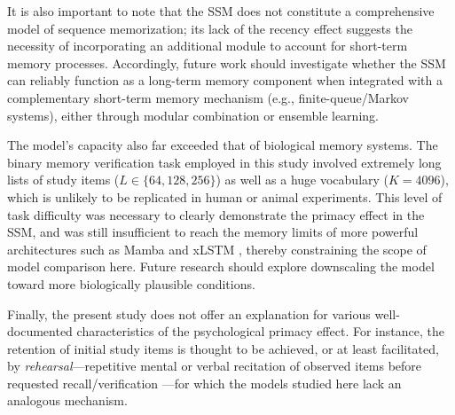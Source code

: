 \documentclass[10pt,letterpaper]{article}
\begin{document}
It is also important to note that the SSM does not constitute a comprehensive model of sequence memorization;
its lack of the recency effect suggests the necessity of incorporating an additional module to account for short-term memory processes.
Accordingly, future work should investigate whether the SSM can reliably function as a long-term memory component when integrated with a complementary short-term memory mechanism (e.g., finite-queue/Markov systems), either through modular combination or ensemble learning.


The model's capacity also far exceeded that of biological memory systems.
The binary memory verification task employed in this study involved extremely long lists of study items ($L \in \{64, 128, 256\}$) as well as a huge vocabulary ($K=4096$), which is unlikely to be replicated in human or animal experiments.
This level of task difficulty was necessary to clearly demonstrate the primacy effect in the SSM, and was still insufficient to reach the memory limits of more powerful architectures such as Mamba \citep{GuDao24,DaoGu24} and xLSTM \citep{Beck+24},%
thereby constraining the scope of model comparison here.
Future research should explore downscaling the model toward more biologically plausible conditions.


Finally, the present study does not offer an explanation for various well-documented characteristics of the psychological primacy effect.
For instance, the retention of initial study items is thought to be achieved, or at least facilitated, by \emph{rehearsal}---repetitive mental or verbal recitation of observed items before requested recall/verification \citep[][%
]{Rundus71,MarshallWerder72,Glenberg+80}---for which the models studied here lack an analogous mechanism.

\end{document}
